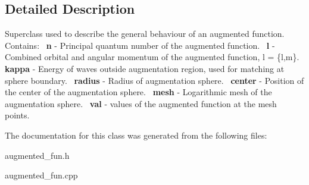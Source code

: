 \subsection{Detailed Description}
Superclass used to describe the general behaviour of an augmented function.~\newline
Contains\+:~\newline
{\bfseries n} -\/ Principal quantum number of the augmented function.~\newline
{\bfseries l} -\/ Combined orbital and angular momentum of the augmented function, l = \{l,m\}.~\newline
{\bfseries kappa} -\/ Energy of waves outside augmentation region, used for matching at sphere boundary.~\newline
{\bfseries radius} -\/ Radius of augmentation sphere.~\newline
{\bfseries center} -\/ Position of the center of the augmentation sphere.~\newline
{\bfseries mesh} -\/ Logarithmic mesh of the augmentation sphere.~\newline
{\bfseries val} -\/ values of the augmented function at the mesh points.~\newline


The documentation for this class was generated from the following files\+:\begin{DoxyCompactItemize}
\item 
augmented\+\_\+fun.\+h\item 
augmented\+\_\+fun.\+cpp\end{DoxyCompactItemize}

